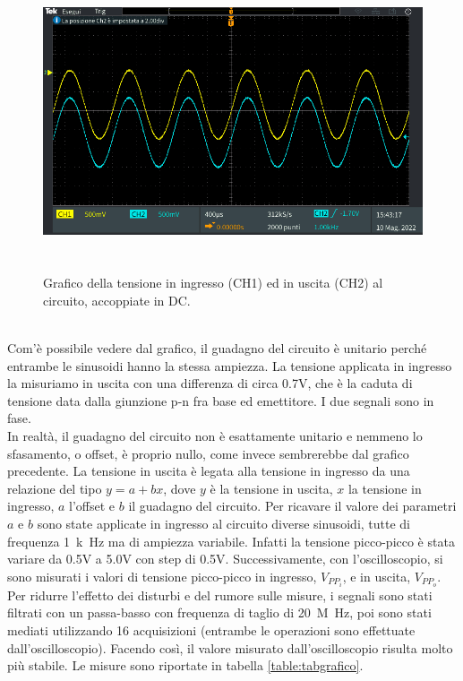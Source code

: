 \documentclass{report}
\begin{document}
\begin{figure}[h]
\centering
\includegraphics[height=8.8cm]{immagini/oscillo1}
\caption{Grafico della tensione in ingresso (CH1) ed in uscita (CH2) al circuito, accoppiate in DC.}
\label{figura:oscillo1}
\end{figure}
\\
Com'è possibile vedere dal grafico, il guadagno del circuito è unitario perché entrambe le sinusoidi hanno la stessa ampiezza. La tensione applicata in ingresso la misuriamo in uscita con una differenza di circa 0.7V, che è la caduta di tensione data dalla giunzione p-n fra base ed emettitore. I due segnali sono in fase. 
\\ In realtà, il guadagno del circuito non è esattamente unitario e nemmeno lo sfasamento, o offset, è proprio nullo, come invece sembrerebbe dal grafico precedente. La tensione in uscita è legata alla tensione in ingresso da una relazione del tipo $y=a+bx$, dove $y$ è la tensione in uscita, $x$ la tensione in ingresso, $a$ l'offset e $b$ il guadagno del circuito. Per ricavare il valore dei parametri $a$ e $b$ sono state applicate in ingresso al circuito diverse sinusoidi, tutte di frequenza \SI {1}{k\hertz} ma di ampiezza variabile. Infatti la tensione picco-picco è stata variare da 0.5V a 5.0V con step di 0.5V. Successivamente, con l'oscilloscopio, si sono misurati i valori di tensione picco-picco in ingresso, $V_{PP_i}$, e in uscita, $V_{PP_o}$. 
\\\indent Per ridurre l'effetto dei disturbi e del rumore sulle misure, i segnali sono stati filtrati con un passa-basso con frequenza di taglio di \SI{20}{M\hertz}, poi sono stati mediati utilizzando 16 acquisizioni (entrambe le operazioni sono effettuate dall'oscilloscopio). Facendo così, il valore misurato dall'oscilloscopio risulta molto più stabile. Le misure sono riportate in tabella \ref{table:tabgrafico}.
\end{document}
